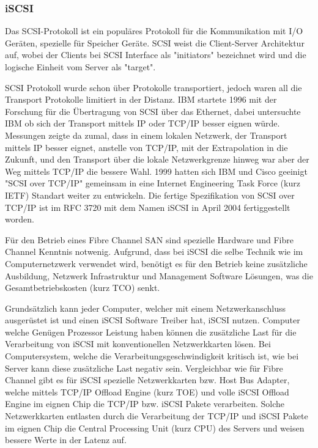 \subsubsection{iSCSI}
Das SCSI-Protokoll ist ein populäres Protokoll für die Kommunikation mit I/O Geräten, spezielle für Speicher Geräte. SCSI weist die Client-Server Architektur auf, wobei der Clients bei SCSI Interface als "initiators" bezeichnet wird und die logische Einheit vom Server als "target".

SCSI Protokoll wurde schon über Protokolle transportiert, jedoch waren all die Transport Protokolle limitiert in der Distanz. \gls{IBM} startete 1996 mit der Forschung für die Übertragung von SCSI über das Ethernet, dabei untersuchte \gls{IBM} ob sich der Transport mittels IP oder \gls{TCP/IP} besser eignen würde. Messungen zeigte da zumal, dass in einem lokalen Netzwerk, der Transport mittels IP besser eignet, anstelle von TCP/IP, mit der Extrapolation in die Zukunft, und den Transport über die lokale Netzwerkgrenze hinweg war aber der Weg mittels TCP/IP die bessere Wahl. 1999 hatten sich \gls{IBM} und \gls{Cisco} geeinigt "SCSI over TCP/IP" gemeinsam in eine Internet Engineering Task Force (kurz \gls{IETF}) Standart weiter zu entwickeln. \cite{JohnL.202} Die fertige Spezifikation von SCSI over \gls{TCP/IP} ist im \gls{RFC} 3720 mit dem Namen iSCSI in April 2004 fertiggestellt worden.\cite{J.Satran2004}

Für den Betrieb eines Fibre Channel SAN sind spezielle Hardware und Fibre Channel Kenntnis notwenig. Aufgrund, dass bei iSCSI die selbe Technik wie im Computernetzwerk verwendet wird, benötigt es für den Betrieb keine zusätzliche Ausbildung, Netzwerk Infrastruktur und Management Software Lösungen, was die Gesamtbetriebskosten (kurz TCO) senkt.

Grundsätzlich kann jeder Computer, welcher mit einem Netzwerkanschluss ausgerüstet ist und einen iSCSI Software Treiber hat, iSCSI nutzen. Computer welche Genügen Prozessor Leistung haben können die zusätzliche Last für die Verarbeitung von iSCSI mit konventionellen Netzwerkkarten lösen. Bei Computersystem, welche die Verarbeitungsgeschwindigkeit kritisch ist, wie bei Server kann diese zusätzliche Last negativ sein. Vergleichbar wie für Fibre Channel gibt es für iSCSI spezielle Netzwerkkarten bzw. Host Bus Adapter, welche mittels TCP/IP Offload Engine (kurz TOE) und volle iSCSI Offload Engine im eignen Chip die \gls{TCP/IP} bzw. iSCSI Pakete verarbeiten. Solche Netzwerkkarten entlasten durch die Verarbeitung der \gls{TCP/IP} und iSCSI Pakete im eignen Chip die Central Processing Unit (kurz \gls{CPU}) des Servers und weisen bessere Werte in der Latenz auf.

